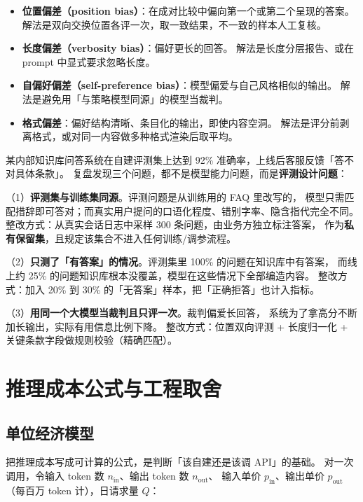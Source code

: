 \begin{itemize}
  \item \textbf{位置偏差（position bias）}：在成对比较中偏向第一个或第二个呈现的答案。
        解法是双向交换位置各评一次，取一致结果，不一致的样本人工复核。
  \item \textbf{长度偏差（verbosity bias）}：偏好更长的回答。
        解法是长度分层报告、或在 prompt 中显式要求忽略长度。
  \item \textbf{自偏好偏差（self-preference bias）}：模型偏爱与自己风格相似的输出。
        解法是避免用「与策略模型同源」的模型当裁判。
  \item \textbf{格式偏差}：偏好结构清晰、条目化的输出，即使内容空洞。
        解法是评分前剥离格式，或对同一内容做多种格式渲染后取平均。
\end{itemize}

\begin{casebox}[案例：企业知识库问答上线前的评测翻车复盘（示范）]
某内部知识库问答系统在自建评测集上达到 92\% 准确率，上线后客服反馈「答不对具体条款」。
复盘发现三个问题，都不是模型能力问题，而是\textbf{评测设计问题}：

（1）\textbf{评测集与训练集同源}。评测问题是从训练用的 FAQ 里改写的，
模型只需匹配措辞即可答对；而真实用户提问的口语化程度、错别字率、隐含指代完全不同。
整改方式：从真实会话日志中采样 300 条问题，由业务方独立标注答案，
作为\textbf{私有保留集}，且规定该集合不进入任何训练/调参流程。

（2）\textbf{只测了「有答案」的情况}。评测集里 100\% 的问题在知识库中有答案，
而线上约 25\% 的问题知识库根本没覆盖，模型在这些情况下全部编造内容。
整改方式：加入 20\% 到 30\% 的「无答案」样本，把「正确拒答」也计入指标。

（3）\textbf{用同一个大模型当裁判且只评一次}。裁判偏爱长回答，
系统为了拿高分不断加长输出，实际有用信息比例下降。
整改方式：位置双向评测 + 长度归一化 + 关键条款字段做规则校验（精确匹配）。
\end{casebox}

\section{推理成本公式与工程取舍}
\label{sec:nlp-cost}

\subsection{单位经济模型}

把推理成本写成可计算的公式，是判断「该自建还是该调 API」的基础。
对一次调用，令输入 token 数 $n_{\text{in}}$、输出 token 数 $n_{\text{out}}$、
输入单价 $p_{\text{in}}$、输出单价 $p_{\text{out}}$（每百万 token 计），日请求量 $Q$：

